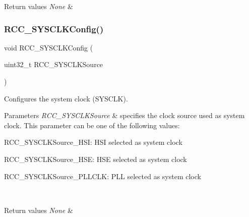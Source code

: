 \begin{DoxyRetVals}{Return values}
{\em None} & \\
\hline
\end{DoxyRetVals}
\mbox{\label{group___r_c_c___exported___functions_ga3551a36a8f0a3dc96a74d6b939048337}} 
\subsubsection{\texorpdfstring{RCC\_SYSCLKConfig()}{RCC\_SYSCLKConfig()}}
{\footnotesize\ttfamily void R\+C\+C\+\_\+\+S\+Y\+S\+C\+L\+K\+Config (\begin{DoxyParamCaption}\item[{uint32\+\_\+t}]{R\+C\+C\+\_\+\+S\+Y\+S\+C\+L\+K\+Source }\end{DoxyParamCaption})}



Configures the system clock (S\+Y\+S\+C\+LK). 


\begin{DoxyParams}{Parameters}
{\em R\+C\+C\+\_\+\+S\+Y\+S\+C\+L\+K\+Source} & specifies the clock source used as system clock. This parameter can be one of the following values\+: \begin{DoxyItemize}
\item R\+C\+C\+\_\+\+S\+Y\+S\+C\+L\+K\+Source\+\_\+\+H\+SI\+: H\+SI selected as system clock \item R\+C\+C\+\_\+\+S\+Y\+S\+C\+L\+K\+Source\+\_\+\+H\+SE\+: H\+SE selected as system clock \item R\+C\+C\+\_\+\+S\+Y\+S\+C\+L\+K\+Source\+\_\+\+P\+L\+L\+C\+LK\+: P\+LL selected as system clock \end{DoxyItemize}
\\
\hline
\end{DoxyParams}

\begin{DoxyRetVals}{Return values}
{\em None} & \\
\hline
\end{DoxyRetVals}
\mbox{\label{group___r_c_c___exported___functions_ga895b3ff3d143c990f1cd0146aa260081}} 
